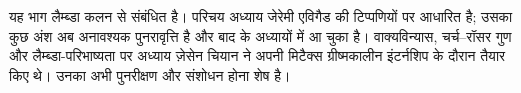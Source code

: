 \documentclass[../../include/open-logic-part]{subfiles}
\begin{document}

\begin{editorial}
यह भाग लैम्ब्डा कलन से संबंधित है। परिचय अध्याय जेरेमी एविगैड की टिप्पणियों
पर आधारित है; उसका कुछ अंश अब अनावश्यक पुनरावृत्ति है और बाद के अध्यायों
में आ चुका है। वाक्यविन्यास, चर्च--रॉसर गुण और लैम्ब्डा-परिभाष्यता पर
अध्याय ज़ेसेन चियान ने अपनी मिटैक्स ग्रीष्मकालीन इंटर्नशिप के दौरान तैयार
किए थे। उनका अभी पुनरीक्षण और संशोधन होना शेष है।
\end{editorial}





\OLEndPartHook
\end{document}
